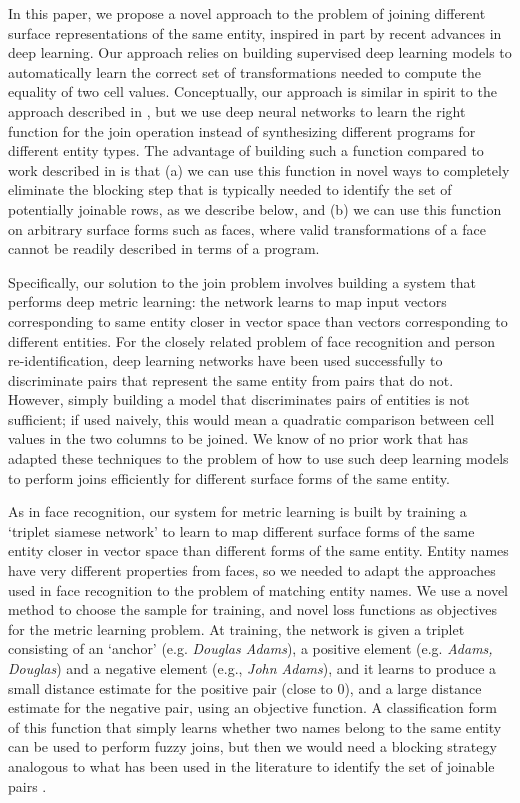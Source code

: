 In this paper, we propose a novel approach to the problem of joining different surface representations of the same entity, inspired in part by recent advances in deep learning.  Our approach relies on building supervised deep learning models to automatically learn the correct set of transformations needed to compute the equality of two cell values.  Conceptually, our approach is similar in spirit to the approach described in \cite{auto-join-joining-tables-leveraging-transformations}, but we use deep neural networks to learn the right function for the join operation instead of synthesizing different programs for different entity types.  The advantage of building such a function compared to work described in \cite{auto-join-joining-tables-leveraging-transformations} is that (a) we can use this function in novel ways to completely eliminate the blocking step that is typically needed to identify the set of potentially joinable rows, as we describe below, and (b) we can use this function on arbitrary surface forms such as faces, where valid transformations of a face cannot be readily described in terms of a program.

Specifically, our solution to the join problem involves building a system that performs deep metric learning: the network learns to map input vectors corresponding to same entity closer in vector space than vectors corresponding to different entities.  For the closely related problem of face recognition and person re-identification, deep learning networks have been used successfully to discriminate pairs that represent the same entity from pairs that do not.  However, simply building a model that discriminates pairs of entities is not sufficient; if used naively, this would mean a quadratic comparison between cell values in the two columns to be joined.  We know of no prior work that has adapted these techniques to the problem of how to use such deep learning models to perform joins efficiently for different surface forms of the same entity.  

As in face recognition, our system for metric learning is built by training a `triplet siamese network' to learn to map different surface forms of the same entity closer in vector space than different forms of the same entity.  Entity names have very different properties from faces, so we needed to adapt the approaches used in face recognition to the problem of matching entity names.  We use a novel method to choose the sample for training, and novel loss functions as objectives for the metric learning problem.  At training, the network is given a triplet consisting of an `anchor' (e.g. \textit{Douglas Adams}), a positive element (e.g. \textit{Adams, Douglas}) and a negative element (e.g., \textit{John Adams}), and it learns to produce a small distance estimate for the positive pair (close to 0), and a large distance estimate for the negative pair, using an objective function. A classification form of this function that simply learns whether two names belong to the same entity can be used to perform fuzzy joins, but then we would need a blocking strategy analogous to what has been used in the literature to identify the set of joinable pairs \cite{auto-join-joining-tables-leveraging-transformations}.  

